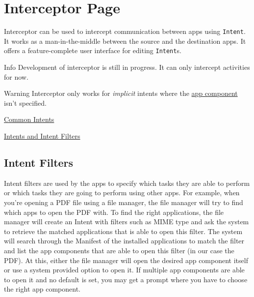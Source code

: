 \section{Interceptor Page}\label{sec:interceptor-page}
Interceptor can be used to intercept communication between apps using \texttt{Intent}. It works as a man-in-the-middle
between the source and the destination apps. It offers a feature-complete user interface for editing \texttt{Intent}s.

\begin{tip}{Info}
    Development of interceptor is still in progress. It can only intercept activities for now.
\end{tip}

\begin{warning}{Warning}
    Interceptor only works for \textit{implicit} intents where the \hyperref[subsec:faq:what-are-app-components]{app
    component} isn't specified.
\end{warning}

\begin{amseealso}
    \item \href{https://developer.android.com/guide/components/intents-common}{Common Intents}
    \item \href{https://developer.android.com/guide/components/intents-filters}{Intents and Intent Filters}
\end{amseealso}

\subsection{Intent Filters}\label{subsec:intent-filters}
Intent filters are used by the apps to specify which tasks they are able to perform or which tasks they are going to
perform using other apps. For example, when you're opening a PDF file using a file manager, the file manager will try
to find which apps to open the PDF with. To find the right applications, the file manager will create an Intent with
filters such as MIME type and ask the system to retrieve the matched applications that is able to open this filter.
The system will search through the Manifest of the installed applications to match the filter and list the app
components that are able to open this filter (in our case the PDF). At this, either the file manager will open the
desired app component itself or use a system provided option to open it. If multiple app components are able to open it
and no default is set, you may get a prompt where you have to choose the right app component.

